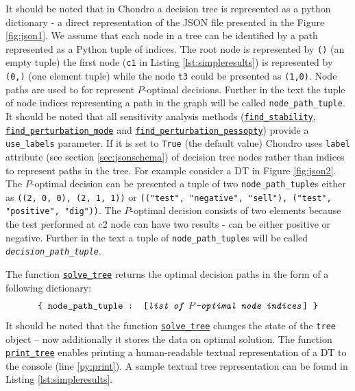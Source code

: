 \documentclass[a4paper,10pt,english]{sphinxmanual}
\begin{document}
	It should be noted that in Chondro a decision tree is represented as a python dictionary - a direct representation of the JSON file presented in the Figure \ref{fig:json1}. We assume that each node in a tree can be identified by a path represented as a Python tuple of indices. The root node is represented by \texttt{()} (an empty tuple) the first node (\texttt{c1} in Listing \ref{lst:simpleresults}) is represented by \texttt{(0,)} (one element tuple) while the node \texttt{t3}  could be presented as \texttt{(1,0)}. Node paths are used to for represent $P$-optimal decisions. Further in the text the tuple of node indices representing a path in the graph will be called \texttt{node\_path\_tuple}.  It should be noted that all sensitivity analysis methods (\hyperref[index:chondro.find_stability]{\texttt{find\_stability}},
	\hyperref[index:chondro.find_perturbation_mode]{\texttt{find\_perturbation\_mode}} and  \hyperref[index:chondro.find_perturbation_pessopty]{\texttt{find\_perturbation\_pessopty}}) provide a \texttt{use\_labels} parameter. If it is set to \texttt{True} (the default value) Chondro uses  \texttt{label} attribute (see section \ref{sec:jsonschema}) of decision tree nodes rather than indices to represent paths in the tree. For example consider a DT in Figure \ref{fig:json2}. The $P$-optimal decision can be presented a tuple of two \texttt{node\_path\_tuple}s either as \texttt{((2, 0, 0), (2, 1, 1))} or  \texttt{(("test", "negative", "sell"), ("test", "positive", "dig"))}. The $P$-optimal decision consists of two elements because the test performed at c2 node can have two results - can be either positive or negative. Further in the text a tuple of \texttt{node\_path\_tuple}s will be called \emph{\texttt{decision\_path\_tuple}}.
	
	The function \hyperref[index:chondro.solve_tree]{\texttt{solve\_tree}} returns the optimal decision paths in the form of a following dictionary:	
	\begin{equation*}
	 \texttt{\{ node\_path\_tuple : [\textit{list of $P$-optimal node indices}] \}}
	\end{equation*}
	It should be noted that the function \hyperref[index:chondro.solve_tree]{\texttt{solve\_tree}} changes the state of the \texttt{tree} object -- now additionally it stores the data on optimal solution. The function \hyperref[index:chondro.print_tree]{\texttt{print\_tree}} enables printing a human-readable textual representation of a DT to the console (line \ref{py:print}). A sample textual tree representation can be found in Listing \ref{lst:simpleresults}.  
	
\end{document}
